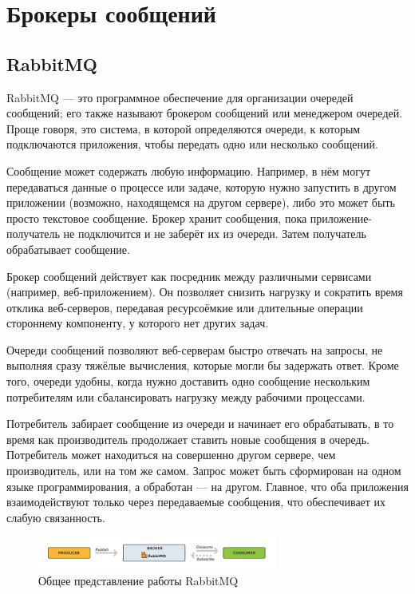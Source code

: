 \section{Брокеры сообщений}
\subsection{RabbitMQ}

RabbitMQ — это программное обеспечение для организации очередей сообщений; его также называют брокером сообщений или менеджером очередей. Проще говоря, это система, в которой определяются очереди, к которым подключаются приложения, чтобы передать одно или несколько сообщений.

Сообщение может содержать любую информацию. Например, в нём могут передаваться данные о процессе или задаче, которую нужно запустить в другом приложении (возможно, находящемся на другом сервере), либо это может быть просто текстовое сообщение. Брокер хранит сообщения, пока приложение-получатель не подключится и не заберёт их из очереди. Затем получатель обрабатывает сообщение.

Брокер сообщений действует как посредник между различными сервисами (например, веб-приложением). Он позволяет снизить нагрузку и сократить время отклика веб-серверов, передавая ресурсоёмкие или длительные операции стороннему компоненту, у которого нет других задач.

Очереди сообщений позволяют веб-серверам быстро отвечать на запросы, не выполняя сразу тяжёлые вычисления, которые могли бы задержать ответ. Кроме того, очереди удобны, когда нужно доставить одно сообщение нескольким потребителям или сбалансировать нагрузку между рабочими процессами.

Потребитель забирает сообщение из очереди и начинает его обрабатывать, в то время как производитель продолжает ставить новые сообщения в очередь. Потребитель может находиться на совершенно другом сервере, чем производитель, или на том же самом. Запрос может быть сформирован на одном языке программирования, а обработан — на другом. Главное, что оба приложения взаимодействуют только через передаваемые сообщения, что обеспечивает их слабую связанность.

\begin{figure}[h!]
    \centering
    \includegraphics[width=0.7\textwidth]{styles/diploma/inc/rabbitmq1.png} 
    \caption{Общее представление работы RabbitMQ}
    \label{fig:example}
\end{figure}


